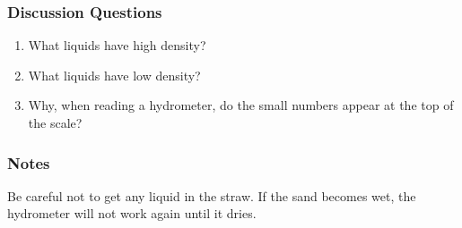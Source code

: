 \subsubsection*{Discussion Questions}
\begin{enumerate}
\item{What liquids have high density?}
\item{What liquids have low density?}
\item{Why, when reading a hydrometer, do the small numbers appear at the top of the scale?}
\end{enumerate}

\subsubsection*{Notes}
Be careful not to get any liquid in the straw. If the sand becomes wet, the hydrometer will not work again until it dries.  